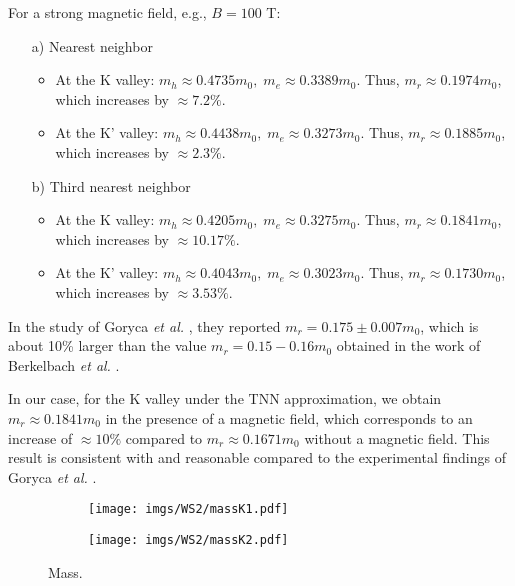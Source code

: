 \documentclass{article}
\begin{document}
For a strong magnetic field, e.g., $B = 100$ T:
\begin{itemize}
	\item[a)] Nearest neighbor
	      \begin{itemize}
		      \item At the K valley: $m_{h} \approx 0.4735 m_{0},\; m_{e} \approx 0.3389 m_{0}$. Thus, $m_{r} \approx 0.1974 m_{0}$, which increases by $\approx 7.2\%$.
		      \item At the K' valley: $m_{h} \approx 0.4438 m_{0},\; m_{e} \approx 0.3273 m_{0}$. Thus, $m_{r} \approx 0.1885 m_{0}$, which increases by $\approx 2.3\%$.
	      \end{itemize}
	\item[b)] Third nearest neighbor
	      \begin{itemize}
		      \item At the K valley: $m_{h} \approx 0.4205 m_{0},\; m_{e} \approx 0.3275 m_{0}$. Thus, $m_{r} \approx 0.1841 m_{0}$, which increases by $\approx 10.17\%$.
		      \item At the K' valley: $m_{h} \approx 0.4043 m_{0},\; m_{e} \approx 0.3023 m_{0}$. Thus, $m_{r} \approx 0.1730 m_{0}$, which increases by $\approx 3.53\%$.
	      \end{itemize}
\end{itemize}

In the study of Goryca \textit{et al.} \cite{goryca2019}, they reported $m_{r} = 0.175 \pm 0.007 m_{0}$, which is about 10\% larger than the value $m_{r} = 0.15 - 0.16 m_{0}$ obtained in the work of Berkelbach \textit{et al.} \cite{berkelbach2013}.

In our case, for the K valley under the TNN approximation, we obtain $m_{r} \approx 0.1841 m_{0}$ in the presence of a magnetic field, which corresponds to an increase of $\approx 10\%$ compared to $m_{r} \approx 0.1671 m_{0}$ without a magnetic field. This result is consistent with and reasonable compared to the experimental findings of Goryca \textit{et al.} \cite{goryca2019}.


\begin{figure}[htb]
	\begin{subfigure}{0.495\textwidth}
		\centering
		\texttt{[image: imgs/WS2/massK1.pdf]}
	\end{subfigure}
	\begin{subfigure}{0.495\textwidth}
		\centering
		\texttt{[image: imgs/WS2/massK2.pdf]}
	\end{subfigure}
	\caption{Mass.}
\end{figure}
\end{document}
